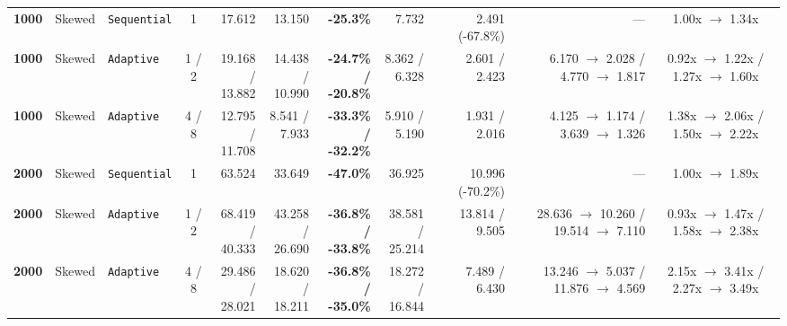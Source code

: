\documentclass[11pt,a4paper]{article}
\renewcommand{\_}{\textunderscore\allowbreak}
\begin{document}
\begin{table}[H]
{\begin{tabular}{r l l c r r r r r r c}
\textbf{1000} & Skewed & \texttt{Sequential} & 1 & 17.612 & 13.150 & \textbf{-25.3\%} & 7.732 & 2.491 (-67.8\%) & --- & 1.00x $\to$ 1.34x \\
\textbf{1000} & Skewed & \texttt{Adaptive} & 1 / 2 & \makecell[r]{19.168 /\\ 13.882} & \makecell[r]{14.438 /\\ 10.990} & \makecell[r]{\textbf{-24.7\% /}\\ \textbf{-20.8\%}} & \makecell[r]{8.362 /\\ 6.328} & \makecell[r]{2.601 /\\ 2.423} & \makecell[r]{6.170 $\to$ 2.028 /\\ 4.770 $\to$ 1.817} & \makecell[c]{0.92x $\to$ 1.22x /\\ 1.27x $\to$ 1.60x} \\
\textbf{1000} & Skewed & \texttt{Adaptive} & 4 / 8 & \makecell[r]{12.795 /\\ 11.708} & \makecell[r]{8.541 /\\ 7.933} & \makecell[r]{\textbf{-33.3\% /}\\ \textbf{-32.2\%}} & \makecell[r]{5.910 /\\ 5.190} & \makecell[r]{1.931 /\\ 2.016} & \makecell[r]{4.125 $\to$ 1.174 /\\ 3.639 $\to$ 1.326} & \makecell[c]{1.38x $\to$ 2.06x /\\ 1.50x $\to$ 2.22x} \\
\textbf{2000} & Skewed & \texttt{Sequential} & 1 & 63.524 & 33.649 & \textbf{-47.0\%} & 36.925 & 10.996 (-70.2\%) & --- & 1.00x $\to$ 1.89x \\
\textbf{2000} & Skewed & \texttt{Adaptive} & 1 / 2 & \makecell[r]{68.419 /\\ 40.333} & \makecell[r]{43.258 /\\ 26.690} & \makecell[r]{\textbf{-36.8\% /}\\ \textbf{-33.8\%}} & \makecell[r]{38.581 /\\ 25.214} & \makecell[r]{13.814 /\\ 9.505} & \makecell[r]{28.636 $\to$ 10.260 /\\ 19.514 $\to$ 7.110} & \makecell[c]{0.93x $\to$ 1.47x /\\ 1.58x $\to$ 2.38x} \\
\textbf{2000} & Skewed & \texttt{Adaptive} & 4 / 8 & \makecell[r]{29.486 /\\ 28.021} & \makecell[r]{18.620 /\\ 18.211} & \makecell[r]{\textbf{-36.8\% /}\\ \textbf{-35.0\%}} & \makecell[r]{18.272 /\\ 16.844} & \makecell[r]{7.489 /\\ 6.430} & \makecell[r]{13.246 $\to$ 5.037 /\\ 11.876 $\to$ 4.569} & \makecell[c]{2.15x $\to$ 3.41x /\\ 2.27x $\to$ 3.49x} \\

\end{tabular}}
\end{table}
\end{document}
